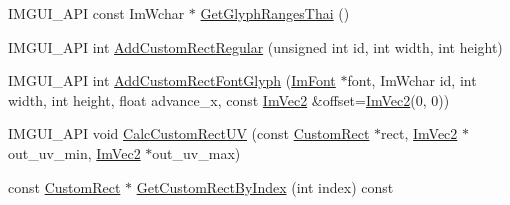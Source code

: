 \begin{DoxyCompactItemize}
\item 
I\+M\+G\+U\+I\+\_\+\+A\+PI const Im\+Wchar $\ast$ \hyperlink{struct_im_font_atlas_a4985c51d8a5270ff027f13fa44a14371}{Get\+Glyph\+Ranges\+Thai} ()
\item 
I\+M\+G\+U\+I\+\_\+\+A\+PI int \hyperlink{struct_im_font_atlas_ac51952803d2205f28ca9fc996c5f6243}{Add\+Custom\+Rect\+Regular} (unsigned int id, int width, int height)
\item 
I\+M\+G\+U\+I\+\_\+\+A\+PI int \hyperlink{struct_im_font_atlas_a5643182be4e3f1a442cfa6cdc0321c7c}{Add\+Custom\+Rect\+Font\+Glyph} (\hyperlink{struct_im_font}{Im\+Font} $\ast$font, Im\+Wchar id, int width, int height, float advance\+\_\+x, const \hyperlink{struct_im_vec2}{Im\+Vec2} \&offset=\hyperlink{struct_im_vec2}{Im\+Vec2}(0, 0))
\item 
I\+M\+G\+U\+I\+\_\+\+A\+PI void \hyperlink{struct_im_font_atlas_a70e062104b11a213eb3d177151c418e2}{Calc\+Custom\+Rect\+UV} (const \hyperlink{struct_im_font_atlas_1_1_custom_rect}{Custom\+Rect} $\ast$rect, \hyperlink{struct_im_vec2}{Im\+Vec2} $\ast$out\+\_\+uv\+\_\+min, \hyperlink{struct_im_vec2}{Im\+Vec2} $\ast$out\+\_\+uv\+\_\+max)
\item 
const \hyperlink{struct_im_font_atlas_1_1_custom_rect}{Custom\+Rect} $\ast$ \hyperlink{struct_im_font_atlas_a4d4403e920f1d93307936781050b52ee}{Get\+Custom\+Rect\+By\+Index} (int index) const
\end{DoxyCompactItemize}

